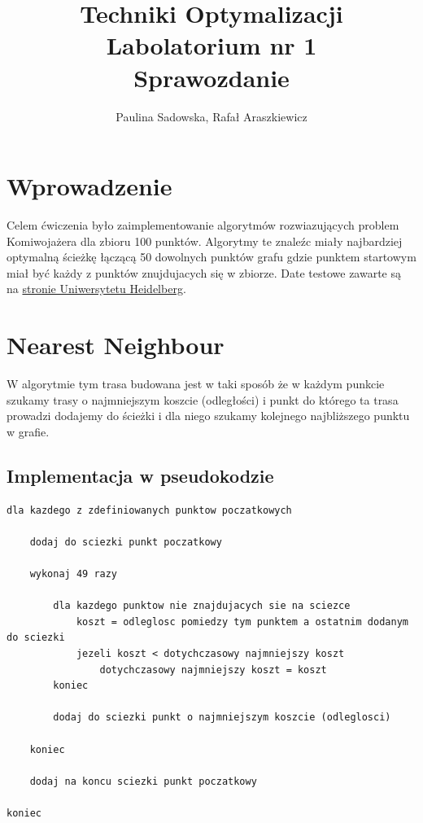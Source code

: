 \documentclass[a4paper 10pt]{article}
\title{\textbf{Techniki Optymalizacji} \\
Labolatorium nr 1 \\
Sprawozdanie}
\author{Paulina Sadowska, Rafał Araszkiewicz}
\begin{document}
\maketitle

\section{Wprowadzenie}
Celem ćwiczenia było zaimplementowanie algorytmów rozwiazujących problem Komiwojażera dla zbioru 100 punktów. Algorytmy te znaleźc miały najbardziej optymalną ścieżkę łączącą 50 dowolnych punktów grafu gdzie punktem startowym miał być każdy z punktów znujdujacych się w zbiorze. Date testowe zawarte są na \hyperref[http://comopt.ifi.uni-heidelberg.de/software/TSPLIB95/XML-TSPLIB/instances/kroA100.xml.zip]{stronie Uniwersytetu Heidelberg}. 
\section{Nearest Neighbour}
\label{Nearest}
W algorytmie tym trasa budowana jest w taki sposób że w każdym punkcie szukamy trasy o najmniejszym koszcie (odległości) i punkt do którego ta trasa prowadzi dodajemy do ścieżki i dla niego szukamy kolejnego najbliższego punktu w grafie.
\subsection{Implementacja w pseudokodzie}
\begin{lstlisting}[frame=single]
dla kazdego z zdefiniowanych punktow poczatkowych
	
	dodaj do sciezki punkt poczatkowy
			
	wykonaj 49 razy 
	
		dla kazdego punktow nie znajdujacych sie na sciezce
			koszt = odleglosc pomiedzy tym punktem a ostatnim dodanym do sciezki
			jezeli koszt < dotychczasowy najmniejszy koszt
				dotychczasowy najmniejszy koszt = koszt
		koniec
	
		dodaj do sciezki punkt o najmniejszym koszcie (odleglosci)
		
	koniec	
	
	dodaj na koncu sciezki punkt poczatkowy
	
koniec

\end{lstlisting}
\label{Nearest code}
\end{document}
